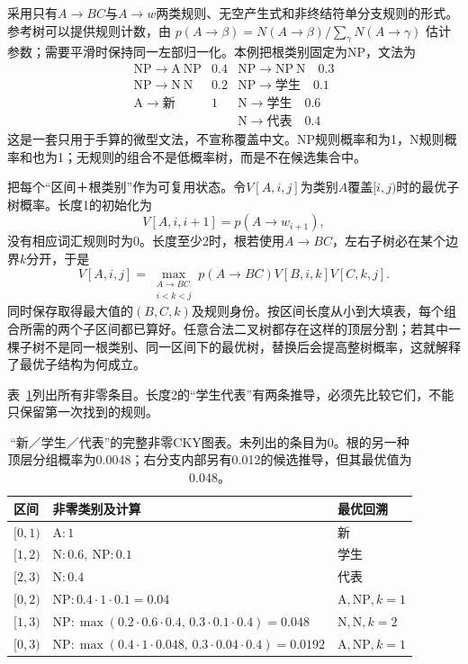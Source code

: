 采用只有$A\to BC$与$A\to w$两类规则、无空产生式和非终结符单分支规则的形式。参考树可以提供规则计数，由
$p(A\to\beta)=N(A\to\beta)/\sum_{\gamma}N(A\to\gamma)$
估计参数；需要平滑时保持同一左部归一化。本例把根类别固定为NP，文法为
\[
\begin{array}{lll}
 \mathrm{NP}\to\mathrm A\ \mathrm{NP}&0.4&
 \mathrm{NP}\to\mathrm{NP}\ \mathrm N\quad0.3\\
 \mathrm{NP}\to\mathrm N\ \mathrm N&0.2&
 \mathrm{NP}\to\text{学生}\quad0.1\\
 \mathrm A\to\text{新}&1&
 \mathrm N\to\text{学生}\quad0.6\\
 &&\mathrm N\to\text{代表}\quad0.4
\end{array}
\]
这是一套只用于手算的微型文法，不宣称覆盖中文。NP规则概率和为1，N规则概率和也为1；无规则的组合不是低概率树，而是不在候选集合中。

把每个“区间＋根类别”作为可复用状态。令$V[A,i,j]$为类别$A$覆盖$[i,j)$时的最优子树概率。长度1的初始化为
\[
 V[A,i,i+1]=p(A\to w_{i+1}),
\]
没有相应词汇规则时为0。长度至少2时，根若使用$A\to BC$，左右子树必在某个边界$k$分开，于是
\begin{equation}
 V[A,i,j]=
 \max_{\substack{A\to BC\\i<k<j}}
 p(A\to BC)V[B,i,k]V[C,k,j].
 \label{eq:nlp-analysis-pcfg-cky}
\end{equation}
同时保存取得最大值的$(B,C,k)$及规则身份。按区间长度从小到大填表，每个组合所需的两个子区间都已算好。任意合法二叉树都存在这样的顶层分割；若其中一棵子树不是同一根类别、同一区间下的最优树，替换后会提高整树概率，这就解释了最优子结构为何成立。

表~\ref{tab:nlp-analysis-cky}列出所有非零条目。长度2的“学生代表”有两条推导，必须先比较它们，不能只保留第一次找到的规则。

\begin{table}[htbp]
  \centering
  \begin{tabularx}{\linewidth}{@{}l X l@{}}
    \toprule
    区间&非零类别及计算&最优回溯\\
    \midrule
    $[0,1)$&$\mathrm A:1$&新\\
    $[1,2)$&$\mathrm N:0.6,\ \mathrm{NP}:0.1$&学生\\
    $[2,3)$&$\mathrm N:0.4$&代表\\
    $[0,2)$&$\mathrm{NP}:0.4\cdot1\cdot0.1=0.04$&$\mathrm A,\mathrm{NP},k=1$\\
    $[1,3)$&$\mathrm{NP}:\max(0.2\cdot0.6\cdot0.4,\,
      0.3\cdot0.1\cdot0.4)=0.048$&$\mathrm N,\mathrm N,k=2$\\
    $[0,3)$&$\mathrm{NP}:\max(0.4\cdot1\cdot0.048,\,
      0.3\cdot0.04\cdot0.4)=0.0192$&$\mathrm A,\mathrm{NP},k=1$\\
    \bottomrule
  \end{tabularx}
  \caption{“新／学生／代表”的完整非零CKY图表。未列出的条目为0。根的另一种顶层分组概率为0.0048；右分支内部另有0.012的候选推导，但其最优值为0.048。}
  \label{tab:nlp-analysis-cky}
\end{table}

